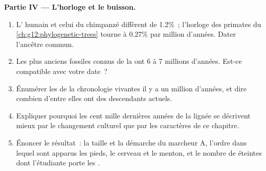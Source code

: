 \begin{problem}
\medskip
\noindent\textbf{Partie IV --- L'horloge et le buisson.}
\begin{enumerate}[resume]
  \item L' humain et celui du chimpanzé diffèrent de 1.2\%~;
        l'horloge des primates du \cref{ch:g12:phylogenetic-trees}
        tourne à 0.27\% par million d'années. Dater l'ancêtre commun.
  \item Les plus anciens fossiles connus de la  ont 6 à
        7 millions d'années. Est-ce compatible avec votre date~?
  \item Énumérer les  de la chronologie vivantes il y a un
        million d'années, et dire combien d'entre elles ont des
        descendants actuels.
  \item Expliquer pourquoi les cent mille dernières années de la
        lignée se décrivent mieux par le changement culturel que par
        les caractères de ce chapitre.
  \item Énoncer le résultat~: la taille et la démarche du marcheur A,
        l'ordre dans lequel sont apparus les pieds, le cerveau et le
        menton, et le nombre de  éteintes dont l'étudiante
        porte les .
\end{enumerate}
\end{problem}
